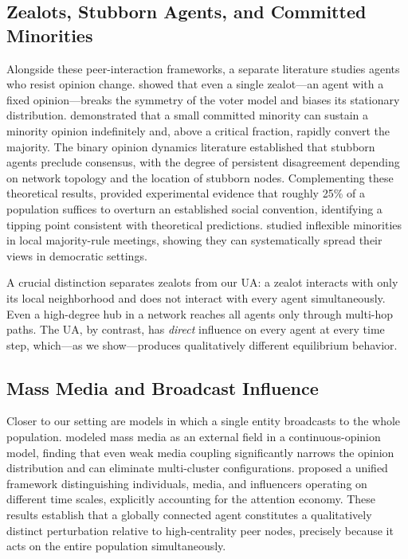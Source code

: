 \documentclass{article}
\theoremstyle{plain}
\theoremstyle{definition}
\theoremstyle{remark}
\begin{document}
\subsection{Zealots, Stubborn Agents, and Committed Minorities}

Alongside these peer-interaction frameworks, a separate literature
studies agents who resist opinion change. \citet{mobilia2003}
showed that even a single zealot---an agent with a fixed opinion---breaks
the symmetry of the voter model and biases its stationary distribution.
\citet{mobilia2007} demonstrated that a small committed minority can
sustain a minority opinion indefinitely and, above a critical fraction,
rapidly convert the majority. The binary opinion dynamics literature
\citep{acemoglu2013binary} established that stubborn agents preclude
consensus, with the degree of persistent disagreement depending on network
topology and the location of stubborn nodes.
Complementing these theoretical results, \citet{centola2018} provided
experimental evidence that roughly 25\% of a population suffices to
overturn an established social convention, identifying a tipping point
consistent with theoretical predictions.
\citet{galam2002} studied inflexible minorities in local majority-rule
meetings, showing they can systematically spread their views in
democratic settings.

A crucial distinction separates zealots from our UA: a zealot interacts
with only its local neighborhood and does not interact with every agent
simultaneously. Even a high-degree hub in a network reaches all agents
only through multi-hop paths. The UA, by contrast, has \emph{direct}
influence on every agent at every time step, which---as we show---produces
qualitatively different equilibrium behavior.

\subsection{Mass Media and Broadcast Influence}

Closer to our setting are models in which a single entity broadcasts
to the whole population. \citet{crokidakis2014} modeled mass media as
an external field in a continuous-opinion model, finding that even weak
media coupling significantly narrows the opinion distribution and can
eliminate multi-cluster configurations. \citet{chica2023} proposed a
unified framework distinguishing individuals, media, and influencers
operating on different time scales, explicitly accounting for the
attention economy. These results establish that a globally connected
agent constitutes a qualitatively distinct perturbation relative to
high-centrality peer nodes, precisely because it acts on the entire
population simultaneously.
\end{document}
